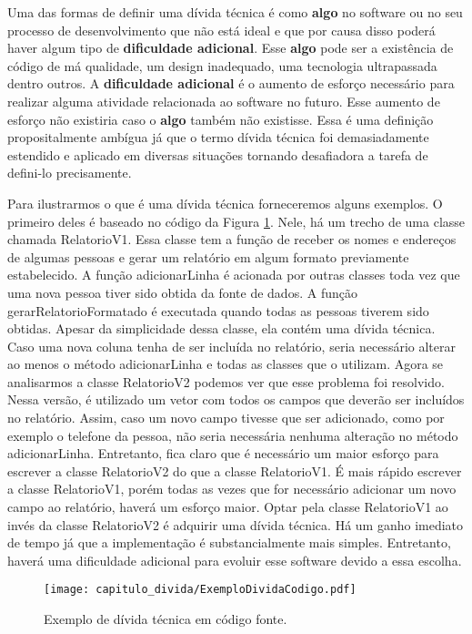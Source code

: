 Uma das formas de definir uma dívida técnica é como \textbf{algo} no software ou no seu processo de desenvolvimento que não está ideal e que por causa disso poderá haver algum tipo de \textbf{dificuldade adicional}. Esse \textbf{algo} pode ser a existência de código de má qualidade, um design inadequado, uma tecnologia ultrapassada dentro outros. A \textbf{dificuldade adicional} é o aumento de esforço necessário para realizar alguma atividade relacionada ao software no futuro.  Esse aumento de esforço não existiria caso o \textbf{algo} também não existisse. Essa é uma definição propositalmente ambígua já que o termo dívida técnica foi demasiadamente estendido e aplicado em diversas situações tornando desafiadora a tarefa de defini-lo precisamente. 



Para ilustrarmos o que é uma dívida técnica forneceremos alguns exemplos. O primeiro deles é baseado no código da Figura \ref{fig:cap1_exemplo_divida_codigo}. Nele, há um trecho de uma classe chamada RelatorioV1. Essa classe tem a função de receber os nomes e endereços de algumas pessoas e gerar um relatório em algum formato previamente estabelecido. A função adicionarLinha é acionada por outras classes toda vez que uma nova pessoa tiver sido obtida da fonte de dados. A função gerarRelatorioFormatado é executada quando todas as pessoas tiverem sido obtidas. Apesar da simplicidade dessa classe, ela contém uma dívida técnica. Caso uma nova coluna tenha de ser incluída no relatório, seria necessário alterar ao menos o método adicionarLinha e todas as classes que o utilizam. Agora se analisarmos a classe RelatorioV2 podemos ver que esse problema foi resolvido. Nessa versão, é utilizado um vetor com todos os campos que deverão ser incluídos no relatório. Assim, caso um novo campo tivesse que ser adicionado, como por exemplo o telefone da pessoa, não seria necessária nenhuma alteração no método adicionarLinha. Entretanto, fica claro que é necessário um maior esforço para escrever a classe RelatorioV2 do que a classe RelatorioV1. É mais rápido escrever a classe RelatorioV1, porém todas as vezes que for necessário adicionar um novo campo ao relatório, haverá um esforço maior. Optar pela classe RelatorioV1 ao invés da classe RelatorioV2 é adquirir uma dívida técnica. Há um ganho imediato de tempo já que a implementação é substancialmente mais simples. Entretanto, haverá uma dificuldade adicional para evoluir esse software devido a essa escolha.

  \begin{figure}[H]
  \centering
  \texttt{[image: capitulo\_divida/ExemploDividaCodigo.pdf]} 
  \caption{Exemplo de dívida técnica em código fonte. }
  \label{fig:cap1_exemplo_divida_codigo} 
\end{figure}


